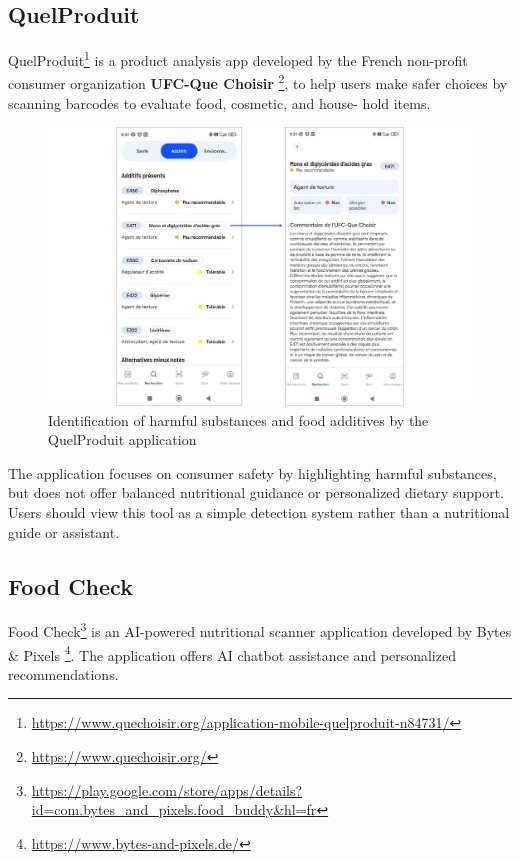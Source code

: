 \subsection{QuelProduit}
QuelProduit\footnote{\url{https://www.quechoisir.org/application-mobile-quelproduit-n84731/}} is a product 
analysis app developed by the French non-profit consumer organization \textbf{UFC-Que Choisir} \footnote{\url{https://www.quechoisir.org/}}, to help users make
safer choices by scanning barcodes to evaluate food, cosmetic, and house-
hold items. 
 \begin{center}
\begin{figure}[H]
\includegraphics[scale=0.23]{images/quelproduit.jpg}
\caption{Identification of harmful substances and food additives by the QuelProduit application}
\label{fig:queChoisir}
\end{figure}
\end{center}

\par The application focuses on consumer safety by highlighting
harmful substances, but does not offer balanced nutritional guidance or
personalized dietary support. Users should view this tool as a simple
detection system rather than a nutritional guide or assistant.
 \subsection{Food Check}
Food Check\footnote{\url{https://play.google.com/store/apps/details?id=com.bytes_and_pixels.food_buddy&hl=fr}} is an AI-powered nutritional scanner application developed by 
Bytes \& Pixels \footnote{\url{https://www.bytes-and-pixels.de/}}. The application offers AI chatbot assistance and personalized recommendations.

